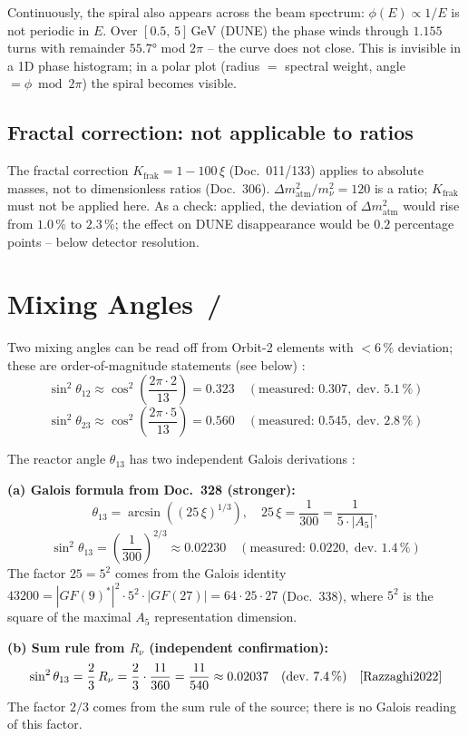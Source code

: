 Continuously, the spiral also appears across the beam spectrum:
$\phi(E)\propto1/E$ is not periodic in $E$. Over
$[0.5,\,5]\,\text{GeV}$ (DUNE) the phase winds through $1.155$
turns with remainder $55.7°$ mod $2\pi$ -- the curve does not
close. This is invisible in a 1D phase histogram; in a polar plot
(radius $=$ spectral weight, angle $=\phi\bmod2\pi$) the spiral
becomes visible.

\subsection{Fractal correction: not applicable to ratios}

The fractal correction $K_\text{frak}=1-100\,\xi$ (Doc.~011/133)
applies to absolute masses, not to dimensionless ratios
(Doc.~306). $\Delta m^2_\text{atm}/m_\nu^2=120$ is a ratio;
$K_\text{frak}$ must not be applied here. As a check: applied, the
deviation of $\Delta m^2_\text{atm}$ would rise from $1.0\,\%$ to
$2.3\,\%$; the effect on DUNE disappearance would be $0.2$
percentage points -- below detector resolution.

\section{Mixing Angles \KM\,/\,\SM}

Two mixing angles can be read off from Orbit-2 elements with
$<6\,\%$ deviation; these are order-of-magnitude statements (see below) \SM:
\[
\sin^2\theta_{12}\approx\cos^2\!\left(\frac{2\pi\cdot2}{13}\right)=0.323
\quad(\text{measured: }0.307,\;\text{dev.\ }5.1\,\%)
\]
\[
\sin^2\theta_{23}\approx\cos^2\!\left(\frac{2\pi\cdot5}{13}\right)=0.560
\quad(\text{measured: }0.545,\;\text{dev.\ }2.8\,\%)
\]

The reactor angle $\theta_{13}$ has two independent Galois derivations \KM:

\textbf{(a) Galois formula from Doc.~328 (stronger):}
\[
\theta_{13}=\arcsin\!\left((25\,\xi)^{1/3}\right),\quad
25\,\xi=\frac{1}{300}=\frac{1}{5\cdot|A_5|},
\]
\[
\sin^2\theta_{13}=\left(\frac{1}{300}\right)^{2/3}\approx0.02230
\quad(\text{measured: }0.0220,\;\text{dev.\ }1.4\,\%)
\]
The factor $25=5^2$ comes from the Galois identity
$43200=|GF(9)^*|^2\cdot5^2\cdot|GF(27)|=64\cdot25\cdot27$
(Doc.~338), where $5^2$ is the square of the maximal $A_5$ representation dimension.

\textbf{(b) Sum rule from $R_\nu$ (independent confirmation):}
\[
\sin^2\theta_{13}=\frac{2}{3}\,R_\nu
=\frac{2}{3}\cdot\frac{11}{360}=\frac{11}{540}\approx0.02037
\quad(\text{dev.\ }7.4\,\%)\quad\cite{Razzaghi2022}
\]
The factor $2/3$ comes from the sum rule of the source; there is no Galois
reading of this factor.

